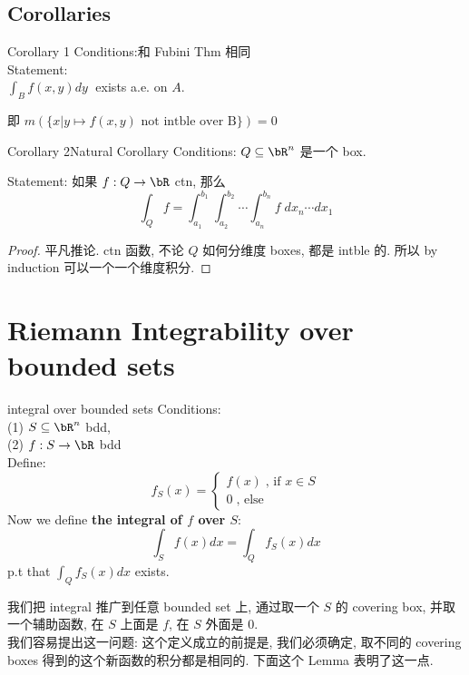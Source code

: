 \subsection{Corollaries}

\begin{corollary}{Corollary 1}
    Conditions:和 Fubini Thm 相同\\
    Statement:\\
    $\int_B f(x,y) dy \;$  exists a.e. on $A$.
\end{corollary}
\begin{remark}
    即 $m (\{ x |  y \mapsto f(x,y) \text{ not intble over B} \}) = 0$ 
\end{remark}



\begin{corollary}{Corollary 2}{Natural Corollary}
Conditions: $Q \subseteq \bR ^ n$ 是一个 box.

Statement: 如果 $f: Q \rightarrow \bR$ ctn, 那么
$$
\int_Q f = \int^{b_1}_{a_1} \int^{b_2}_{a_2} \cdots \int^{b_n}_{a_n} f \; d x_n \cdots d x_1
$$
\end{corollary}

\begin{proof}
    平凡推论. ctn 函数, 不论 $Q$ 如何分维度 boxes, 都是 intble 的. 所以 by induction 可以一个一个维度积分.
\end{proof}






\section{Riemann Integrability over bounded sets}

\begin{definition}{integral over bounded sets}
    Conditions:\\
    (1) $S \sub \bR^n$ bdd, \\
    (2) $f: S \rightarrow \bR$ bdd\\
    Define: 
    $$
    f_S (x) = \begin{cases}
        f(x) \; \text{, if } x \in S \\
        0 \; \text{, else}
    \end{cases}
   $$
   Now we define \textbf{the integral of $f$ over $S$}: 
   $$
   \int_S f(x) dx = \int_Q f_S (x) dx
   $$
   p.t that $\int_Q f_S (x) dx$ exists.
\end{definition}
\begin{remark}
    我们把 integral 推广到任意 bounded set 上, 通过取一个 $S$ 的 covering box, 并取一个辅助函数, 在 $S$ 上面是 $f$, 在 $S$ 外面是 $0$.\\
    我们容易提出这一问题: 这个定义成立的前提是, 我们必须确定, 取不同的 covering boxes 得到的这个新函数的积分都是相同的. 下面这个 Lemma 表明了这一点. 
\end{remark}

